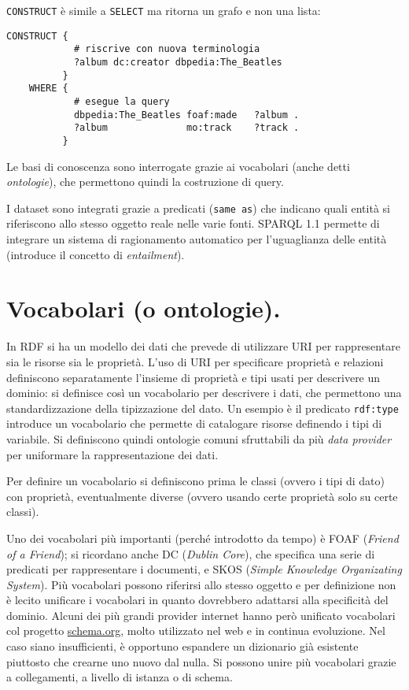 \documentclass[11pt]{article}
\begin{document}
\verb|CONSTRUCT| è simile a \verb|SELECT| ma ritorna un grafo e non una lista:
\begin{verbatim}
CONSTRUCT {
            # riscrive con nuova terminologia
            ?album dc:creator dbpedia:The_Beatles
          }
    WHERE {
            # esegue la query
            dbpedia:The_Beatles foaf:made   ?album .
            ?album              mo:track    ?track .
          }
\end{verbatim}
\begin{multicols}{2}
  
Le basi di conoscenza sono interrogate grazie ai vocabolari (anche detti \textit{ontologie}), che permettono quindi la costruzione di query.

I dataset sono integrati grazie a predicati (\verb|same as|) che indicano quali entità si riferiscono allo stesso oggetto reale nelle varie fonti.
SPARQL 1.1 permette di integrare un sistema di ragionamento automatico per l'uguaglianza delle entità (introduce il concetto di \textit{entailment}).

\section{Vocabolari (o ontologie).}
In RDF si ha un modello dei dati che prevede di utilizzare URI per rappresentare sia le risorse sia le proprietà.
L'uso di URI per specificare proprietà e relazioni definiscono separatamente l'insieme di proprietà e tipi usati per descrivere un dominio: si definisce così un vocabolario per descrivere i dati, che permettono una standardizzazione della tipizzazione del dato.
Un esempio è il predicato \verb|rdf:type| introduce un vocabolario che permette di catalogare risorse definendo i tipi di variabile.
Si definiscono quindi ontologie comuni sfruttabili da più \textit{data provider} per uniformare la rappresentazione dei dati.

Per definire un vocabolario si definiscono prima le classi (ovvero i tipi di dato) con proprietà, eventualmente diverse (ovvero usando certe proprietà solo su certe classi).

Uno dei vocabolari più importanti (perché introdotto da tempo) è FOAF (\textit{Friend of a Friend}); si ricordano anche DC (\textit{Dublin Core}), che specifica una serie di predicati per rappresentare i documenti, e SKOS (\textit{Simple Knowledge Organizating System}).
Più vocabolari possono riferirsi allo stesso oggetto e per definizione non è lecito unificare i vocabolari in quanto dovrebbero adattarsi alla specificità del dominio.
Alcuni dei più grandi provider internet hanno però unificato vocabolari col progetto \url{schema.org}, molto utilizzato nel web e in continua evoluzione.
Nel caso siano insufficienti, è opportuno espandere un dizionario già esistente piuttosto che crearne uno nuovo dal nulla.
Si possono unire più vocabolari grazie a collegamenti, a livello di istanza o di schema.


\end{multicols}
\end{document}
